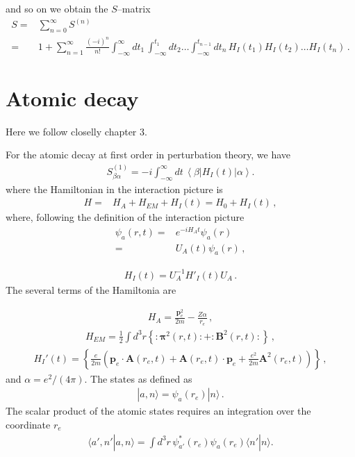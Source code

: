 and so on we obtain the $S$--matrix
\begin{align}
  S=&\sum_{n=0}^\infty S^{(n)}\nonumber\\
  =&1+\sum_{n=1}^\infty\frac{(-i)^n}{n!}\int_{-\infty}^{\infty}d t_1\,\int_{-\infty}^{t_1} d t_2\ldots\int_{-\infty}^{t_{n-1}}d t_n\,{H}_I(t_1){H}_I(t_2)\ldots{H}_I(t_n)\,.
\end{align}


\section{Atomic decay}
\label{sec:atomic-decay}

Here we follow closelly \cite{Gross:1993} chapter 3.

For the atomic decay at first order in perturbation theory, we have
\begin{align}
  S_{\beta\alpha}^{(1)}=-i \int_{-\infty}^\infty dt\, \left\langle\beta\left|H_I(t)\right|\alpha\right\rangle.
\end{align}
where the Hamiltonian in the interaction picture is
\begin{align}
  H=&H_A+H_{EM}+H_I(t)=H_0+H_I(t)\,,
\end{align}
where, following the definition of the interaction picture
\begin{align}
  \psi_a(r,t)=&e^{-i H_A t}\psi_a(r)\nonumber\\
=&U_A(t)\psi_a(r)\,,
\end{align}

\begin{align}
  H_I(t)=U_A^{-1}H'_I(t)U_A\,.
\end{align}
The several terms of the Hamiltonia are

\begin{align}
  H_A=\frac{\mathbf{p}_e^2}{2m}-\frac{Z\alpha}{r_e}\,,
\end{align}
\begin{align}
  H_{EM}=\frac{1}{2}\int d^3r\left\{:\boldsymbol{\pi}^2(r,t):+:\mathbf{B}^2(r,t):\right\}\,,
\end{align}
\begin{align}
  H_I'(t)=\left\{\frac{e}{2m}\left(\mathbf{p}_e\cdot\mathbf{A}(r_e,t)+\mathbf{A}(r_e,t)\cdot \mathbf{p}_e
+\frac{e^2}{2m}\mathbf{A}^2(r_e,t)\right)\right\}\,,
\end{align}
and $\alpha=e^2/(4\pi)$.
The states as defined as
\begin{align}
  |a,n\rangle=\psi_a(r_e)|n\rangle\,.
\end{align}
The scalar product of the atomic states requires an integration over the coordinate $r_e$
\begin{align}
  \label{eq:163}
   \langle a',n'|a,n\rangle=\int d^3r\,\psi_{a'}^*(r_e)\psi_a(r_e)\langle n'|n\rangle.
\end{align}

